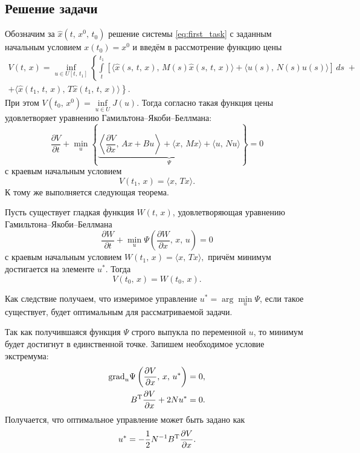 \subsection{Решение задачи}
Обозначим за $\hat x(t,\,x^0,\,t_0)$ решение системы \eqref{eq:first_task} с заданным начальным условием $x(t_0) = x^0$ и введём в рассмотрение функцию цены
\begin{multline*}
        V(t,\,x)
=
\inf\limits_{u \in U[t,\,t_1]} \left\{
        \int\limits_{t}^{t_1}
[
\langle
\hat x(s,\,t,\,x),\,M(s)\hat x(s,\,t,\,x)
\rangle
+
\langle
u(s),\,N(s)u(s)
\rangle
]\,ds
        \;+\right.\\+\left.
        \langle
        \hat x(t_1,\,t,\,x),\,T\hat x(t_1,\,t,\,x)
        \rangle
\right\}.
\end{multline*}
При этом $V(t_0,\,x^0) = \inf\limits_{u\in U} J(u)$. Тогда согласно \cite{krasovsky} такая функция цены удовлетворяет уравнению Гамильтона--Якоби--Беллмана:
\begin{equation}\label{eq:g-ya-b}
        \frac{\partial V}{\partial t}
        +
        \min\limits_{u}
        \left\{
        \underbrace{
\left\langle
\frac{\partial V}{\partial x}
,\,
Ax + Bu
\right\rangle
+
\langle
x,\,Mx
\rangle
+
\langle
u,\,Nu
\rangle
        }\limits_{\Psi}
        \right\}
        =
        0
\end{equation}
с краевым начальным условием
\begin{equation}\label{eq:g-ya-b-side}
        V(t_1,\,x)
        =
        \langle x,\,Tx \rangle.
\end{equation}
К тому же выполняется следующая теорема.
\begin{theorem}[О верификации]
        Пусть существует гладкая функция $W(t,\,x)$, удовлетворяющая уравнению Гамильтона--Якоби--Беллмана
$$
        \frac{\partial W}{\partial t}
        +\min\limits_{u}\Psi\left(\frac{\partial W}{\partial x},\,x,\,u\right) = 0
$$
с краевым начальным условием
$
        W(t_1,\,x) = \langle x,\,Tx \rangle,
$ причём минимум достигается на элементе $u^*$. Тогда $$V(t_0,\,x) = W(t_0,\,x).$$
\end{theorem}
Как следствие получаем, что измеримое управление $u^* = \arg\min\limits_u \Psi$, если такое существует, будет оптимальным для рассматриваемой задачи.

Так как получившаяся функция $\Psi$ строго выпукла по переменной $u$, то минимум будет достигнут в единственной точке. Запишем необходимое условие экстремума:
\begin{align*}
\mathrm{grad}_u \Psi\left(\frac{\partial V}{\partial x},\,x,\,u^*\right) &= 0,\\
B^\mathrm{T}\frac{\partial V}{\partial x} + 2Nu^* &=0. 
\end{align*}
Получается, что оптимальное управление может быть задано как
\begin{equation}
        u^* = -\frac{1}{2}N^{-1}B^\mathrm{T}\frac{\partial V}{\partial x}.
\end{equation}

